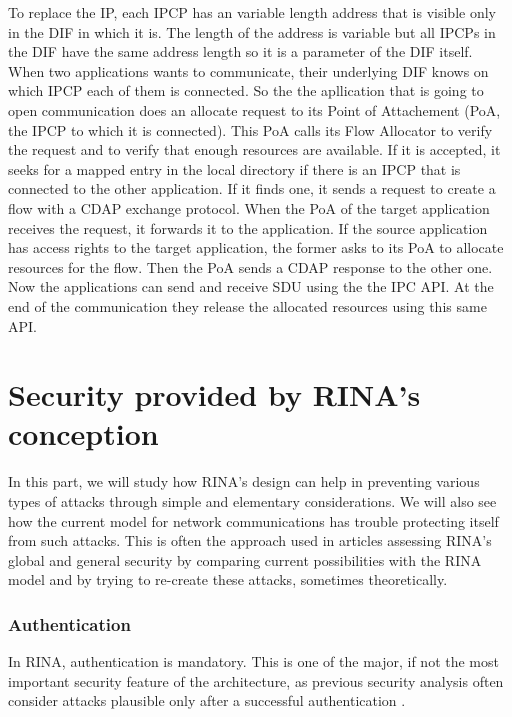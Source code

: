 \documentclass[a4paper]{proc}
\begin{document}
To replace the IP, each IPCP has an variable length address that is visible only
in the DIF in which it is.  The length of the address is variable but all IPCPs
in the DIF have the same address length so it is a parameter of the DIF itself.
When two applications wants to communicate, their underlying DIF knows on which
IPCP each of them is connected.  So the the apllication that is going to open
communication does an allocate request to its Point of Attachement (PoA, the
IPCP to which it is connected).  This PoA calls its Flow Allocator to verify the
request and to verify that enough resources are available.  If it is accepted,
it seeks for a mapped entry in the local directory if there is an IPCP that is
connected to the other application.  If it finds one, it sends a request to
create a flow with a CDAP exchange protocol.  When the PoA of the target
application receives the request, it forwards it to the application.  If the
source application has access rights to the target application, the former asks
to its PoA to allocate resources for the flow.  Then the PoA sends a CDAP
response to the other one.  Now the applications can send and receive SDU using
the the IPC API\@.  At the end of the communication they release the allocated
resources using this same API\@.\cite{Trouva2011ISTI}


\part{Security provided by RINA's conception}

\par In this part, we will study how RINA's design can help in preventing
various types of attacks through simple and elementary considerations. We will
also see how the current model for network communications has trouble protecting
itself from such attacks. This is often the approach used in articles assessing
RINA's global and general security by comparing current possibilities with the
RINA model and by trying to re-create these attacks, sometimes theoretically.

\section{Authentication}

\par In RINA, authentication is mandatory. This is one of the major, if not the
most important security feature of the architecture, as previous security
analysis often consider attacks plausible only after a successful authentication
\cite{assessing-security, wiki, PINS}.
\end{document}
